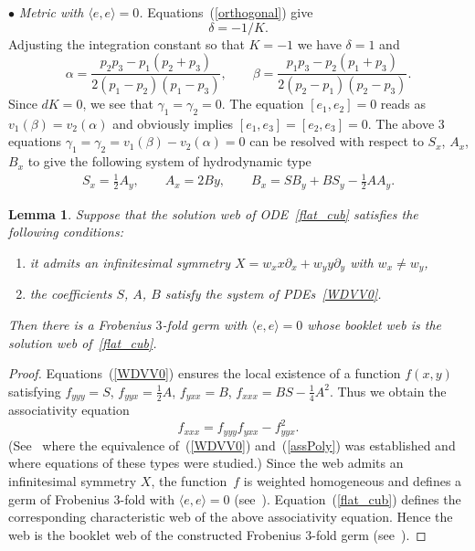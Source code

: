 \documentclass[11pt]{article}
\newtheorem{lemma}{Lemma}
\begin{document}
$\bullet$ {\it Metric with $\langle e,e\rangle =0$.}
Equations~(\ref{orthogonal}) give
\begin{equation}\label{dfor0}
\delta=-1/K.
\end{equation} Adjusting the integration constant so that $K=-1$ we have $\delta =1$ and
\begin{equation}\label{alphabeta0}
\alpha =\frac{p_2p_3-p_1(p_2+p_3)}{2(p_1-p_2)(p_1-p_3)},\qquad \beta =\frac{p_1p_3-p_2(p_1+p_3)}{2(p_2-p_1)(p_2-p_3)}.
\end{equation}
Since $dK=0$, we see that $\gamma_1=\gamma_2=0$.
The equation $[e_1,e_2]=0$ reads as $v_1(\beta)=v_2(\alpha)$ and obviously implies $[e_1,e_3]=[e_2,e_3]=0$.
The above 3 equations $\gamma_1=\gamma_2=v_1(\beta)-v_2(\alpha)=0$
can be resolved with respect to $S_x$, $A_x$, $B_x$
to give the following system of hydrodynamic type
\begin{gather}\label{WDVV0}
S_x= \frac{1}{2}A_y,\qquad
A_x= 2By,\qquad
B_x= SB_y+BS_y-\frac{1}{2}AA_y.
\end{gather}
\begin{lemma}\label{web_ass_0}
Suppose that the solution web of ODE~\eqref{flat_cub} satisfies the following conditions:
\begin{enumerate}\itemsep=0pt
\item[$1)$] it admits an infinitesimal symmetry $X=w_xx\partial_x+w_yy\partial_y$ with $w_x\ne w_y$,
\item[$2)$] the coefficients $S$, $A$, $B$ satisfy the system of PDEs~\eqref{WDVV0}.
\end{enumerate}
Then there is a Frobenius $3$-fold germ with $\langle e,e\rangle =0$ whose booklet web is the solution web of~\eqref{flat_cub}.
\end{lemma}
\begin{proof}
Equations~(\ref{WDVV0}) ensures the local existence of a function $f(x,y)$ satisfying
$f_{yyy}=S$, $f_{yyx}=\frac{1}{2}A$, $f_{yxx}=B$, $f_{xxx}=BS-\frac{1}{4}A^2$.
Thus we obtain the associativity equation
\begin{equation}\label{assPoly}
f_{xxx}=f_{yyy}f_{yxx}-f^2_{yyx}.
\end{equation}
(See~\cite{MFa} where the equivalence of~(\ref{WDVV0}) and~(\ref{assPoly}) was established and~\cite{Al} where equations of these types were studied.)
Since the web admits an inf\/initesimal symmetry $X$, the function~$f$ is weighted homogeneous and def\/ines a germ of Frobenius $3$-fold with $\langle e,e\rangle =0$ (see~\cite{Df}). Equation~(\ref{flat_cub}) def\/ines the corresponding characteristic web of the above associativity equation. Hence the web is the booklet web of the constructed Frobenius $3$-fold germ (see~\cite{Aw}).
\end{proof}
\end{document}

